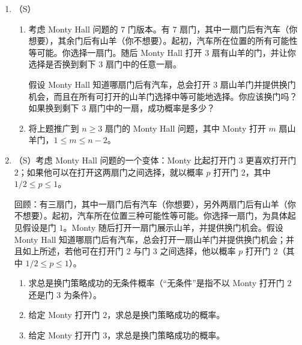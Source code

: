 \documentclass[UTF8, 12pt, fontset=fandol, oneside]{ctexart}
\begin{document}
\begin{enumerate}
  在这个假设下，例如我们知道
  \[
    P(W_1,W_2,W_3^c,W_4^c,\ldots,W_{100}^c|\text{垃圾邮件})
    =
    p_1p_2(1-p_3)(1-p_4)\cdots(1-p_{100}).
  \]
  如果没有朴素贝叶斯假设，就会有远为巨大的统计与计算困难，因为我们需要考虑 $2^{100}\approx 1.3\times 10^{30}$ 个形如
  \[
    A_1\cap A_2\cap\cdots\cap A_{100}
  \]
  的事件，其中每个 $A_j$ 等于 $W_j$ 或 $W_j^c$。现在一封新邮件到达，它包含列表中第 $23,64,65$ 个词或短语（但不包含其他 $97$ 个）。因此我们想计算
  \[
  P(\text{垃圾邮件}|W_1^c,\ldots,W_{22}^c,W_{23},
  W_{24}^c,\ldots,W_{63}^c,W_{64},W_{65},W_{66}^c,\ldots,W_{100}^c).
  \]
  注意，我们需要以\textit{所有}证据为条件，而不仅仅是 $W_{23}\cap W_{64}\cap W_{65}$ 已发生这一事实。求这封新邮件是垃圾邮件的条件概率（用 $p,p_j,r_j$ 表示）。

\subsection*{Monty Hall}

  \item （S）
  \begin{enumerate}
    \item 考虑 Monty Hall 问题的 $7$ 门版本。有 $7$ 扇门，其中一扇门后有汽车（你想要），其余门后有山羊（你不想要）。起初，汽车所在位置的所有可能性等可能。你选择一扇门。随后 Monty Hall 打开 $3$ 扇有山羊的门，并让你选择是否换到剩下 $3$ 扇门中的任意一扇。

    假设 Monty Hall 知道哪扇门后有汽车，总会打开 $3$ 扇山羊门并提供换门机会，而且在所有可打开的山羊门选择中等可能地选择。你应该换门吗？如果换到剩下 $3$ 扇门中的一扇，成功概率是多少？
    \item 将上题推广到 $n\ge 3$ 扇门的 Monty Hall 问题，其中 Monty 打开 $m$ 扇山羊门，$1\le m\le n-2$。
  \end{enumerate}

  \item （S）考虑 Monty Hall 问题的一个变体：Monty 比起打开门 $3$ 更喜欢打开门 $2$；如果他可以在打开这两扇门之间选择，就以概率 $p$ 打开门 $2$，其中 $1/2\le p\le 1$。

  回顾：有三扇门，其中一扇门后有汽车（你想要），另外两扇门后有山羊（你不想要）。起初，汽车所在位置三种可能性等可能。你选择一扇门，为具体起见假设是门 $1$。Monty 随后打开一扇门展示山羊，并提供换门机会。假设 Monty Hall 知道哪扇门后有汽车，总会打开一扇山羊门并提供换门机会；并且如上所述，若他可在打开门 $2$ 与门 $3$ 之间选择，他以概率 $p$ 打开门 $2$（其中 $1/2\le p\le 1$）。
  \begin{enumerate}
    \item 求总是换门策略成功的无条件概率（“无条件”是指不以 Monty 打开门 $2$ 还是门 $3$ 为条件）。
    \item 给定 Monty 打开门 $2$，求总是换门策略成功的概率。
    \item 给定 Monty 打开门 $3$，求总是换门策略成功的概率。
  \end{enumerate}


\end{enumerate}
\end{document}

